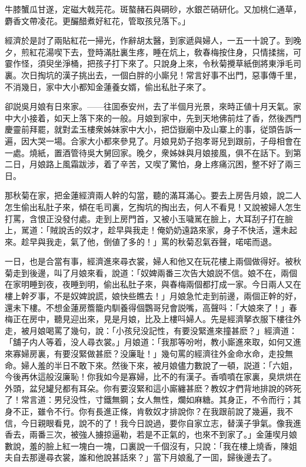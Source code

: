 \begin{myquote}
牛膝蟹瓜甘遂，定磁大戟芫花。斑螯赭石與碙砂，水銀芒硝研化。又加桃仁通草，麝香文帶凌花。更釅醋煮好紅花，管取孩兒落下。」
\end{myquote}

經濟於是討了兩貼紅花一掃光，作辭胡太醫，到家遞與婦人，一五一十說了。到晚夕，煎紅花湯喫下去，登時滿肚裏生疼，睡在炕上，敎春梅按住身，只情揉揣，可霎作怪，須臾坐淨桶，把孩子打下來了。只說身上來，令秋菊攪草紙倒將東淨毛司裏。次日掏坑的漢子挑出去，一個白胖的小廝兒！常言好事不出門，惡事傳千里，不消幾日，家中大小都知金蓮養女婿，偷出私肚子來了。

卻説吳月娘有日來家。——往囬泰安州，去了半個月光景，來時正値十月天氣。家中大小接着，如天上落下來的一般。月娘到家中，先到天地佛前炷了香，然後西門慶靈前拜罷，就對孟玉樓衆姊妹家中大小，把岱嶽廟中及山寨上的事，従頭告訴一遍，因大哭一場。合家大小都來參見了。月娘見奶子抱孝哥兒到跟前，子母相會在一處。燒紙，置酒管待吳大舅回家。晚夕，衆姊妹與月娘接風，俱不在話下。到第二日，月娘路上風霜跋涉，着了辛苦，又喫了驚怕，身上疼痛沉困，整不好了兩三日。

那秋菊在家，把金蓮經濟兩人幹的勾當，聽的滿耳滿心。要去上房告月娘，說二人怎生偷出私肚子來，傾在毛司裏，乞掏坑的掏出去，何人不看見！又說被婦人怎生打罵，含恨正没發付處。走到上房門首，又被小玉噦駡在臉上，大耳刮子打在臉上，駡道：「賊說舌的奴才，趁早與我走！俺奶奶遠路來家，身子不快活，還未起來。趁早與我走，氣了他，倒値了多的！」罵的秋菊忍氣吞聲，喏喏而退。

一日，也是合當有事，經濟進來尋衣裳，婦人和他又在玩花樓上兩個做得好。被秋菊走到後邊，叫了月娘來看，說道：「奴婢兩番三次告大娘説不信。娘不在，兩個在家明睡到夜，夜睡到明，偷出私肚子來，與春梅兩個都打成一家。今日兩人又在樓上幹歹事，不是奴婢說謊，娘快些瞧去！」月娘急忙走到前邊，兩個正幹的好，還未下樓。不想金蓮房簷籠内馴養得個鸚哥兒會説嘴，高聲呌：「大娘來了！」春梅正在房中，聽見迎出來，見是月娘，比及上樓呌婦人。先是經濟拏衣服下樓往外走，被月娘喝罵了幾句，說：「小孩兒没記性，有要没緊進來撞甚麽？」經濟道：「舖子内人等着，没人尋衣裳。」月娘道：「我那等吩咐，教小廝進來取，如何又進來寡婦房裏，有要沒緊做甚麽？没廉耻！」幾句罵的經濟往外金命水命，走投無命。婦人羞的半日不敢下來。然後下來，被月娘儘力數說了一頓，説道：「六姐，今後再休這般沒廉恥！你我如今是寡婦，比不的有漢子。香噴噴在家裏，臭烘烘在外頭，盆兒罐兒都有耳朵。你有要沒緊和這小廝纏甚麽？教奴才們背地排說的硶死了！常言道：男兒没性，寸鐵無鋼；女人無性，爛如麻糖。其身正，不令而行；其身不正，雖令不行。你有長進正條，肯敎奴才排說你？在我跟前說了幾遍，我不信，今日親眼看見，說不的了！我今日說過，要你自家立志，替漢子爭氣。像我進香去，兩番三次，被強人擄掠逼勒，若是不正氣的，也來不到家了。」金蓮喫月娘數說，羞的臉上紅一塊白一塊，口裏說一千個沒有，只說：「我在樓上燒香，陳姐夫自去那邊尋衣裳，誰和他說甚話來？」當下月娘亂了一囬，歸後邊去了。


